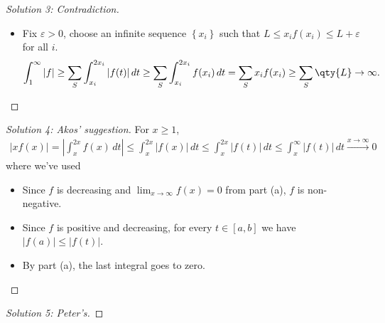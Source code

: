 \begin{solution}[of b]
\begin{proof}[Solution 3: Contradiction]
\begin{itemize}
  \begin{itemize}
  \tightlist
  \item
    Fix \({\varepsilon}> 0\), choose an infinite sequence
    \(\left\{{x_i}\right\}\) such that
    \(L \leq x_i f(x_i) \leq L + {\varepsilon}\) for all \(i\).
    \begin{align*}
    \int_1^\infty {\left\lvert {f} \right\rvert} \geq \sum_S \int_{x_i}^{2x_i} {\left\lvert {f(t)} \right\rvert}\,dt \geq \sum_S \int_{x_i}^{2x_i} f(x_i) \,dt = \sum_S x_i f(x_i) \geq \sum_S \qty{L} \to \infty
    .\end{align*}
  \end{itemize}
\end{itemize}

\end{proof}

\begin{proof}[Solution 4: Akos' suggestion]

For \(x\geq 1\),
\begin{align*}
{\left\lvert {xf(x)} \right\rvert} = {\left\lvert { \int_x^{2x} f(x) \, dt } \right\rvert} \leq \int_x^{2x} {\left\lvert {f(x)} \right\rvert} \, dt \leq \int_x^{2x} {\left\lvert {f(t)} \right\rvert}\, dt \leq \int_x^{\infty} {\left\lvert {f(t)} \right\rvert} \,dt \overset{x\to\infty}\longrightarrow 0
\end{align*}
where we've used

\begin{itemize}
\tightlist
\item
  Since \(f\) is decreasing and \(\lim_{x\to\infty}f(x) =0\) from part
  (a), \(f\) is non-negative.
\item
  Since \(f\) is positive and decreasing, for every \(t\in[a, b]\) we
  have
  \({\left\lvert {f(a)} \right\rvert} \leq {\left\lvert {f(t)} \right\rvert}\).
\item
  By part (a), the last integral goes to zero.
\end{itemize}

\end{proof}

\begin{proof}[Solution 5: Peter's]

\envlist


\end{proof}
\end{solution}
